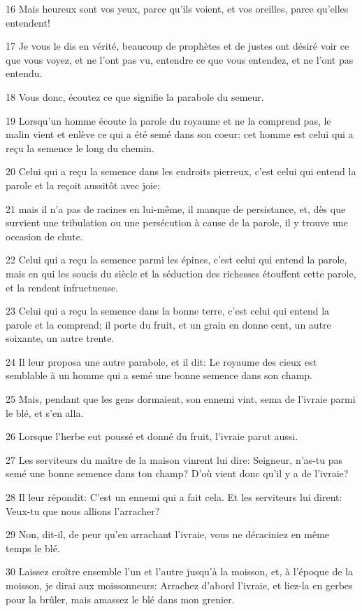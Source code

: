 \par 16 Mais heureux sont vos yeux, parce qu'ils voient, et vos oreilles, parce qu'elles entendent!
\par 17 Je vous le dis en vérité, beaucoup de prophètes et de justes ont désiré voir ce que vous voyez, et ne l'ont pas vu, entendre ce que vous entendez, et ne l'ont pas entendu.
\par 18 Vous donc, écoutez ce que signifie la parabole du semeur.
\par 19 Lorsqu'un homme écoute la parole du royaume et ne la comprend pas, le malin vient et enlève ce qui a été semé dans son coeur: cet homme est celui qui a reçu la semence le long du chemin.
\par 20 Celui qui a reçu la semence dans les endroits pierreux, c'est celui qui entend la parole et la reçoit aussitôt avec joie;
\par 21 mais il n'a pas de racines en lui-même, il manque de persistance, et, dès que survient une tribulation ou une persécution à cause de la parole, il y trouve une occasion de chute.
\par 22 Celui qui a reçu la semence parmi les épines, c'est celui qui entend la parole, mais en qui les soucis du siècle et la séduction des richesses étouffent cette parole, et la rendent infructueuse.
\par 23 Celui qui a reçu la semence dans la bonne terre, c'est celui qui entend la parole et la comprend; il porte du fruit, et un grain en donne cent, un autre soixante, un autre trente.
\par 24 Il leur proposa une autre parabole, et il dit: Le royaume des cieux est semblable à un homme qui a semé une bonne semence dans son champ.
\par 25 Mais, pendant que les gens dormaient, son ennemi vint, sema de l'ivraie parmi le blé, et s'en alla.
\par 26 Lorsque l'herbe eut poussé et donné du fruit, l'ivraie parut aussi.
\par 27 Les serviteurs du maître de la maison vinrent lui dire: Seigneur, n'as-tu pas semé une bonne semence dans ton champ? D'où vient donc qu'il y a de l'ivraie?
\par 28 Il leur répondit: C'est un ennemi qui a fait cela. Et les serviteurs lui dirent: Veux-tu que nous allions l'arracher?
\par 29 Non, dit-il, de peur qu'en arrachant l'ivraie, vous ne déraciniez en même temps le blé.
\par 30 Laissez croître ensemble l'un et l'autre jusqu'à la moisson, et, à l'époque de la moisson, je dirai aux moissonneurs: Arrachez d'abord l'ivraie, et liez-la en gerbes pour la brûler, mais amassez le blé dans mon grenier.
